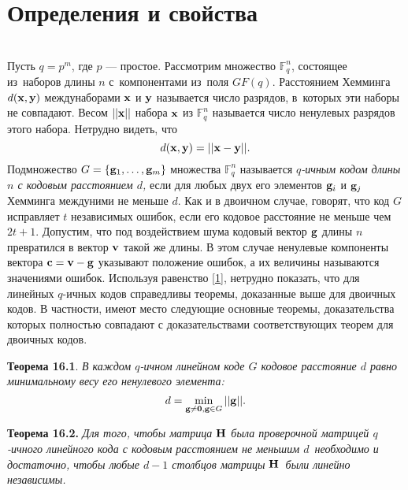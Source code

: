 \documentclass[12pt]{article}
\begin{document}
    \tableofcontents 
    \newpage
    \section{Определения и свойства}\\
    Пусть $q = p^m$, где $p$ --- простое. Рассмотрим множество $\mathbb{F}^n_q$, состоящее из~наборов 
    длины $n$ с~компонентами из~поля $GF(q)$. Расстоянием Хемминга
    $d({\bf x},{\bf y})$ междунаборами ${\bf x}$ и ${\bf y}$ называется число разрядов, в~которых эти
    наборы не совпадают. Весом $||{\bf x}||$ набора ${\bf x}$ из $\mathbb{F}^n_q$ называется число ненулевых разрядов этого набора. Нетрудно видеть, что
    \begin{equation}
        d({\bf x},{\bf y})=||{\bf x}-{\bf y}||.
        \label{1}
    \end{equation}
    Подмножество $G = \{{\bf g}_1,\dots, {\bf g}_m\}$ множества $\mathbb{F}^n_q$ называется {\it$q$-ичным кодом
    длины $n$ с кодовым расстоянием $d$,} если для любых двух его элементов ${\bf g}_i$ и ${\bf g}_j$ { Хемминга междуними не меньше $d$.} Как и в двоичном случае, говорят, что код $G$ исправляет $t$ независимых ошибок, если его кодовое расстояние не меньше чем $2t+1$. Допустим, что под воздействием шума
    кодовый вектор ${\bf g}$ длины $n$ превратился в вектор ${\bf v}$ такой же длины. В этом случае ненулевые компоненты вектора ${\bf c=v-g}$ указывают положение ошибок, а их величины называются значениями ошибок. Используя равенство \eqref{1}, нетрудно показать, что для линейных $q$-ичных кодов справедливы теоремы, доказанные выше для двоичных кодов. В частности, имеют место следующие основные теоремы, доказательства которых полностью совпадают с доказательствами соответствующих теорем для двоичных кодов.
    
    {\bf Теорема 16.1}. {\it В каждом $q$-ичном линейном коде $G$ кодовое расстояние $d$ равно минимальному весу его ненулевого элемента:}
    \begin{equation*}
        d=\min_{{\bf g\not=0,g}\in G}||{\bf g}||.
    \end{equation*}
    
    {\bf Теорема 16.2.} {\it Для того, чтобы матрица ${\bf H}$ была проверочной матрицей 
    $q$-ичного линейного кода с кодовым расстоянием не меньшим $d$~необходимо и достаточно, чтобы любые $d-1$ столбцов матрицы ${\bf H}$~были линейно
    независимы.}
    
\end{document}
